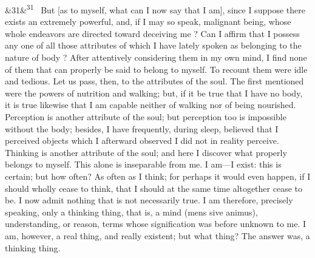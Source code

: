 \documentclass[12pt]{article}
\newcommand{\para}[1][]{\par\noindent\ifx&#1&\else\textsuperscript{\footnotesize #1}~\fi}
\begin{document}
\para[31] But [as to myself, what can I now say that I am], since I suppose there exists an extremely powerful, and, if I may so speak, malignant being, whose whole endeavors are directed toward deceiving me ? Can I affirm that I possess any one of all those attributes of which I have lately spoken as belonging to the nature of body ? After attentively considering them in my own mind, I find none of them that can properly be said to belong to myself. To recount them were idle and tedious. Let us pass, then, to the attributes of the soul. The first mentioned were the powers of nutrition and walking; but, if it be true that I have no body, it is true likewise that I am capable neither of walking nor of being nourished. Perception is another attribute of the soul; but perception too is impossible without the body; besides, I have frequently, during sleep, believed that I perceived objects which I afterward observed I did not in reality perceive. Thinking is another attribute of the soul; and here I discover what properly belongs to myself. This alone is inseparable from me. I am---I exist: this is certain; but how often? As often as I think; for perhaps it would even happen, if I should wholly cease to think, that I should at the same time altogether cease to be. I now admit nothing that is not necessarily true. I am therefore, precisely speaking, only a thinking thing, that is, a mind (mens sive animus), understanding, or reason, terms whose signification was before unknown to me. I am, however, a real thing, and really existent; but what thing? The answer was, a thinking thing.
\end{document}
